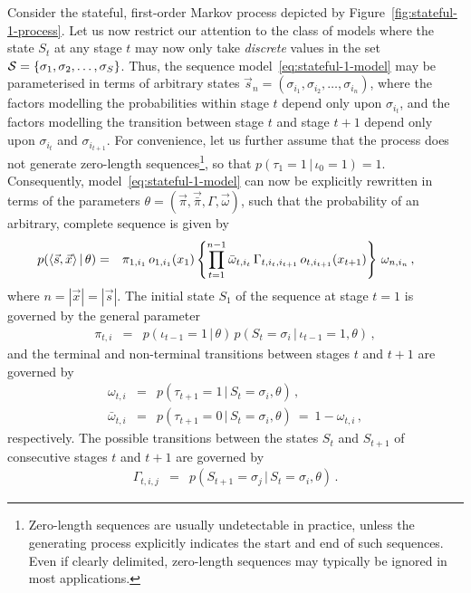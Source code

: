 \documentclass[a4paper]{article}
\begin{document}
Consider the stateful, first-order Markov process depicted by Figure~\ref{fig:stateful-1-process}.
Let us now restrict our attention to the class of models where
the state $S_t$ at any stage $t$ may now only take {\em discrete} values in the set ${\cal S}=\{\sigma_1,\sigma_2,\ldots,\sigma_S\}$.
Thus, the sequence model~\eqref{eq:stateful-1-model} may be parameterised in terms of arbitrary states $\vec{s}_n=(\sigma_{i_1},\sigma_{i_2},\ldots,\sigma_{i_n})$,
where the factors modelling the probabilities within stage $t$ depend only upon $\sigma_{i_t}$, and the factors modelling the transition between stage $t$ and stage $t+1$ 
depend only upon $\sigma_{i_t}$ and $\sigma_{i_{t+1}}$.
For convenience, let us further assume that the process does not generate zero-length sequences\footnote{Zero-length sequences are usually undetectable in practice,
unless the generating process explicitly indicates the start and end of such sequences. Even if clearly delimited, zero-length sequences may typically be ignored in
most applications.}, so that $p(\tau_1=1\,|\,\iota_0=1)=1$.
Consequently, model~\eqref{eq:stateful-1-model} can now be explicitly rewritten in terms of the parameters $\theta=(\vec{\pi},\vec{\bar{\pi}},\Gamma,\vec{\omega})$, 
such that the probability of an arbitrary, complete sequence is given by
\begin{eqnarray}
\hspace*{-5mm}
p(\langle\vec{s},\vec{x}\rangle\,|\,\theta) & = & \pi_{1,i_1}\,o_{1,i_1}(x_1)\left\{\prod_{t=1}^{n-1}\bar{\omega}_{t,i_t}\,\Gamma_{t,i_t,i_{t+1}}\,o_{t,i_{t+1}}(x_{t+1})
\right\}\,\omega_{n,i_n}
\,,
\label{eq:p_s_x_g_theta}
\end{eqnarray}
where $n=|\vec{x}|=|\vec{s}|$.
The initial state $S_1$ of the sequence at stage $t=1$ is governed by the general parameter
\begin{eqnarray}
  \pi_{t,i} & = & p(\iota_{t-1}\!=\!1\,|\,\theta)\,p(S_t\!=\!\sigma_{i}\,|\,\iota_{t-1}\!=\!1,\theta)\,,
\end{eqnarray}
and the terminal and non-terminal transitions between stages $t$ and $t+1$ are governed by
\begin{eqnarray}
  \omega_{t,i} & = & p(\tau_{t+1}=1\,|\,S_t\!=\!\sigma_{i},\theta)\,,
\\
  \bar{\omega}_{t,i} & = & p(\tau_{t+1}=0\,|\,S_t\!=\!\sigma_{i},\theta)~=~1-\omega_{t,i}\,,
\end{eqnarray}
respectively. The possible transitions between the states $S_t$ and $S_{t+1}$ of consecutive stages $t$ and $t+1$ are governed by
\begin{eqnarray}
  \Gamma_{t,i,j} & = & p(S_{t+1}\!=\!\sigma_{j}\,|\,S_t\!=\!\sigma_{i},\theta)\,.
\end{eqnarray}
\end{document}
